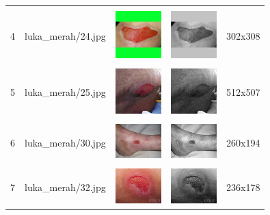\begin{table}[H]
\begin{tabular}{|m{0.2in}|m{1.2in}|m{0.7in}|m{0.7in}|m{0.7in}|}
		& &  &  &\\
		4& 
		luka\_merah/24.jpg &
		\includegraphics[width=0.7in]{dataset/dataset_3/luka_merah/ready/24.jpg}&
		\includegraphics[width=0.7in]{dataset/dataset_3/luka_merah/ready/24_gray.jpg}&
		302x308\\
		\hline
		
		& &  &  &\\
		5& 
		luka\_merah/25.jpg &
		\includegraphics[width=0.7in]{dataset/dataset_3/luka_merah/ready/25.jpg}&
		\includegraphics[width=0.7in]{dataset/dataset_3/luka_merah/ready/25_gray.jpg}&
		512x507\\
		\hline
		
		& &  &  &\\
		6& 
		luka\_merah/30.jpg &
		\includegraphics[width=0.7in]{dataset/dataset_3/luka_merah/ready/30.jpg}&
		\includegraphics[width=0.7in]{dataset/dataset_3/luka_merah/ready/30_gray.jpg}&
		260x194\\
		\hline
		
		& &  &  &\\
		7& 
		luka\_merah/32.jpg &
		\includegraphics[width=0.7in]{dataset/dataset_3/luka_merah/ready/32.jpg}&
		\includegraphics[width=0.7in]{dataset/dataset_3/luka_merah/ready/32_gray.jpg}&
		236x178\\
		\hline
	\end{tabular}
\end{table}

